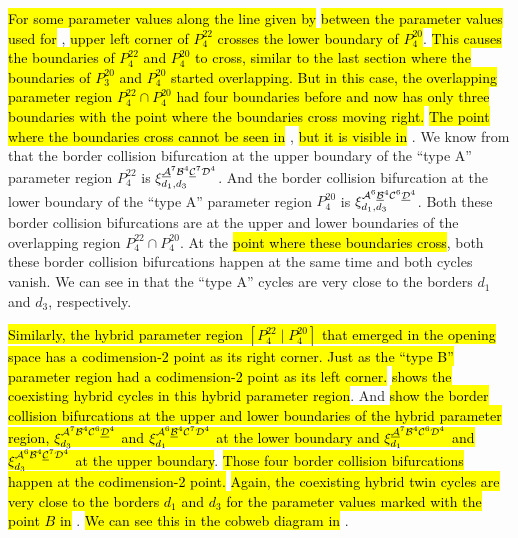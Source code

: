 \hl{For some parameter values along the line given by}  \hl{between the parameter values used for} , \hl{upper left corner of $P^{22}_4$ crosses the lower boundary of $P^{20}_4$}.
\hl{
	This causes the boundaries of $P^{22}_4$ and $P^{20}_4$ to cross, similar to the last section where the boundaries of $P^{20}_3$ and $P^{20}_4$ started overlapping.
	But in this case, the overlapping parameter region $P^{22}_4 \cap P^{20}_4$ had four boundaries before and now has only three boundaries with the point where the boundaries cross moving right.
}
\hl{The point where the boundaries cross cannot be seen in} , \hl{but it is visible in} .
We know from  that the border collision bifurcation at the upper boundary of the ``type A'' parameter region $P^{22}_4$ is $\xi_{d_1, d_3}^{\underline{\mathcal{A}}^7\mathcal{B}^4\underline{\mathcal{C}}^7\mathcal{D}^4}$.
And the border collision bifurcation at the lower boundary of the ``type A'' parameter region $P^{20}_4$ is $\xi_{d_1, d_3}^{\mathcal{A}^6\underline{\mathcal{B}}^4\mathcal{C}^6\underline{\mathcal{D}}^4}$.
Both these border collision bifurcations are at the upper and lower boundaries of the overlapping region $P^{22}_4 \cap P^{20}_4$.
At the \hl{point where these boundaries cross}, both these border collision bifurcations happen at the same time and both cycles vanish.
We can see in  that the ``type A'' cycles are very close to the borders $d_1$ and $d_3$, respectively.

\hl{
	Similarly, the hybrid parameter region $\left[P^{22}_4 \mid P^{20}_4\right]$ that emerged in the opening space has a codimension-2 point as its right corner.
	Just as the ``type B'' parameter region had a codimension-2 point as its left corner.
}
 \hl{shows the coexisting hybrid cycles in this hybrid parameter region}.
And  \hl{show the border collision bifurcations at the upper and lower boundaries of the hybrid parameter region, $\xi_{d_3}^{\mathcal{A}^7\mathcal{B}^4\mathcal{C}^6\underline{\mathcal{D}}^4}$ and $\xi_{d_1}^{\mathcal{A}^6\underline{\mathcal{B}}^4\mathcal{C}^7\mathcal{D}^4}$ at the lower boundary and $\xi_{d_1}^{\underline{\mathcal{A}}^7\mathcal{B}^4\mathcal{C}^6\mathcal{D}^4}$ and $\xi_{d_3}^{\mathcal{A}^6\mathcal{B}^4\underline{\mathcal{C}}^7\mathcal{D}^4}$ at the upper boundary}.
\hl{
	Those four border collision bifurcations happen at the codimension-2 point.
}
\hl{Again, the coexisting hybrid twin cycles are very close to the borders $d_1$ and $d_3$ for the parameter values marked with the point $B$ in} .
\hl{We can see this in the cobweb diagram in} .

